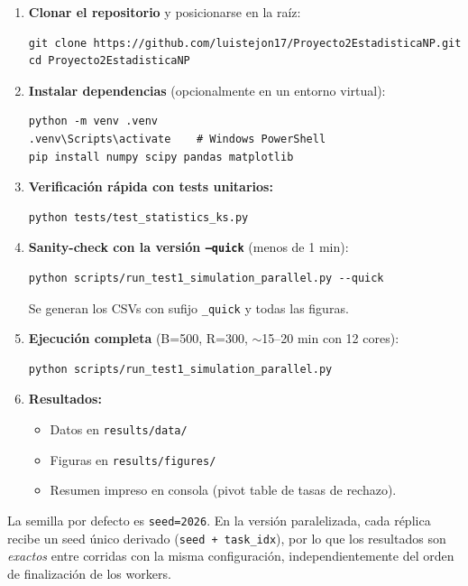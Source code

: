 \documentclass[11pt,a4paper]{article}
\begin{document}
\begin{enumerate}[leftmargin=*]
    \item \textbf{Clonar el repositorio} y posicionarse en la raíz:
    \begin{lstlisting}[style=shellstyle]
git clone https://github.com/luistejon17/Proyecto2EstadisticaNP.git
cd Proyecto2EstadisticaNP
    \end{lstlisting}

    \item \textbf{Instalar dependencias} (opcionalmente en un entorno virtual):
    \begin{lstlisting}[style=shellstyle]
python -m venv .venv
.venv\Scripts\activate    # Windows PowerShell
pip install numpy scipy pandas matplotlib
    \end{lstlisting}

    \item \textbf{Verificación rápida con tests unitarios:}
    \begin{lstlisting}[style=shellstyle]
python tests/test_statistics_ks.py
    \end{lstlisting}

    \item \textbf{Sanity-check con la versión \texttt{--quick}} (menos de 1 min):
    \begin{lstlisting}[style=shellstyle]
python scripts/run_test1_simulation_parallel.py --quick
    \end{lstlisting}
    Se generan los CSVs con sufijo \texttt{\_quick} y todas las figuras.

    \item \textbf{Ejecución completa} (B=500, R=300, $\sim$15--20 min con 12 cores):
    \begin{lstlisting}[style=shellstyle]
python scripts/run_test1_simulation_parallel.py
    \end{lstlisting}

    \item \textbf{Resultados:}
    \begin{itemize}
        \item Datos en \texttt{results/data/}
        \item Figuras en \texttt{results/figures/}
        \item Resumen impreso en consola (pivot table de tasas de rechazo).
    \end{itemize}
\end{enumerate}

\begin{notebox}[title=Reproducibilidad]
La semilla por defecto es \texttt{seed=2026}. En la versión paralelizada, cada réplica recibe un seed único derivado (\texttt{seed + task\_idx}), por lo que los resultados son \emph{exactos} entre corridas con la misma configuración, independientemente del orden de finalización de los workers.
\end{notebox}
\end{document}
